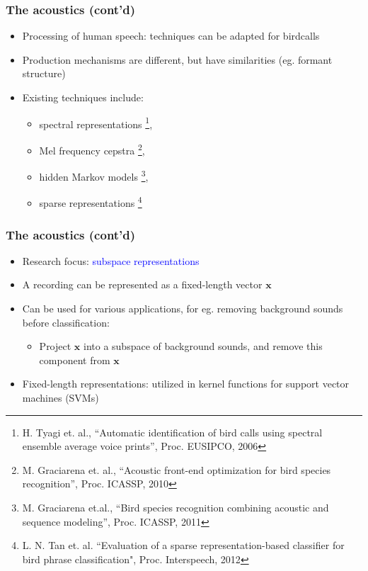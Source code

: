 \documentclass[mathserif]{beamer}
\begin{document}
\begin{frame}
\frametitle{The acoustics (cont'd)}
\begin{itemize}
\item<2-> Processing of human speech: techniques can be adapted for birdcalls
\item<3-> Production mechanisms are different, but have similarities (eg. formant
structure)
\item<4-> Existing techniques include:
\begin{itemize}
	\item spectral representations \footnote{
	H. Tyagi et. al., ``Automatic identification of bird calls using spectral 
	ensemble average voice prints'', Proc. EUSIPCO, 2006},
	\item Mel frequency cepstra \footnote{M. Graciarena et. al., 
	``Acoustic front-end optimization for bird species recognition'', 
	Proc. ICASSP, 2010}, 
	\item hidden Markov models \footnote{M. Graciarena et.al., 
	``Bird species recognition combining acoustic and sequence modeling'', 
	Proc. ICASSP, 2011}, 
	\item sparse representations \footnote{L. N. Tan et. al. 
	``Evaluation of a sparse representation-based classifier for bird phrase 
	classification", Proc. Interspeech, 2012}
\end{itemize}
\end{itemize}
\end{frame}


\begin{frame}
\frametitle{The acoustics (cont'd)}
\begin{itemize}
\item<2-> Research focus: \textcolor{blue}{subspace representations} 
\item<3-> A recording can be represented as a fixed-length vector $\mathbf{x}$ 
\item<4-> Can be used for various applications, for eg. removing background
sounds before classification:
\begin{itemize}
	\item<5-> Project $\mathbf{x}$ into a subspace of background sounds, and remove this
	component from $\mathbf{x}$
\end{itemize}
\item <6-> Fixed-length representations: utilized in kernel functions for
support vector machines (SVMs)
\end{itemize}
\end{frame}
\end{document}
